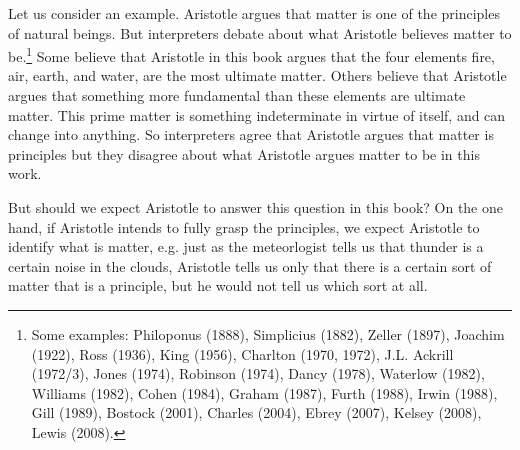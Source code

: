 \documentclass[10pt, oneside]{book}
\begin{document}
Let us consider an example. Aristotle argues that matter is one of the principles of natural beings. But interpreters debate about what Aristotle believes matter to be.\footnote{Some examples: Philoponus (1888), Simplicius (1882), Zeller (1897),  Joachim (1922), Ross (1936), King (1956), Charlton (1970, 1972), J.L. Ackrill (1972/3), Jones (1974), Robinson (1974), Dancy (1978), Waterlow (1982), Williams (1982), Cohen (1984), Graham (1987), Furth (1988), Irwin (1988),  Gill (1989), Bostock (2001), Charles (2004), Ebrey (2007), Kelsey (2008), Lewis (2008).} Some believe that Aristotle in this book argues that the four elements fire, air, earth, and water, are the most ultimate matter. Others believe that Aristotle argues that something more fundamental than these elements are ultimate matter. This prime matter is something indeterminate in virtue of itself, and can change into anything. So interpreters agree that Aristotle argues that matter is principles but they disagree about what Aristotle argues matter to be in this work. 

But should we expect Aristotle to answer this question in this book? On the one hand, if Aristotle intends to fully grasp the principles, we expect Aristotle to identify what is matter, e.g. just as the meteorlogist tells us that thunder is a certain noise in the clouds, Aristotle tells us only that there is a certain sort of matter that is a principle, but he would not tell us which sort at all. 



\enddocument
 
 
\end{document}
